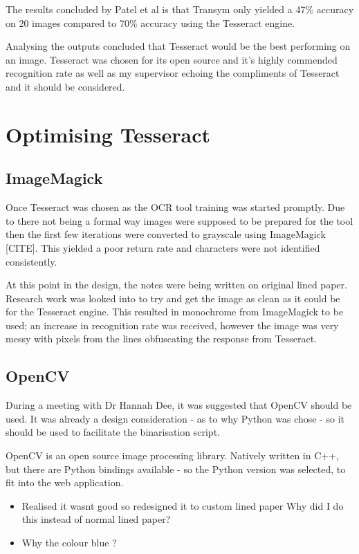 The results concluded by Patel et al is that Transym only yielded a 47\% accuracy on 20 images compared to 70\% accuracy using the Tesseract engine.

Analysing the outputs concluded that Tesseract would be the best performing on an image. Tesseract was chosen for its open source and it's highly commended recognition rate as well as my supervisor echoing the compliments of Tesseract and it should be considered.

\section{Optimising Tesseract}

\subsection{ImageMagick}
Once Tesseract was chosen as the OCR tool training was started promptly. Due to there not being a formal way images were supposed to be prepared for the tool then the first few iterations were converted to grayscale using ImageMagick [CITE]. This yielded a poor return rate and characters were not identified consistently.

At this point in the design, the notes were being written on original lined paper. Research work was looked into to try and get the image as clean as it could be for the Tesseract engine. This resulted in monochrome from ImageMagick to be used; an increase in recognition rate was received, however the image was very messy with pixels from the lines obfuscating the response from Tesseract.

\subsection{OpenCV}
During a meeting with Dr Hannah Dee, it was suggested that OpenCV should be used. It was already a design consideration - as to why Python was chose - so it should be used to facilitate the binarisation script.

OpenCV is an open source image processing library. Natively written in C++, but there are Python bindings available - so the Python version was selected, to fit into the web application.





\begin{itemize}
  \item Realised it wasnt good so redesigned it to custom lined paper Why did I do this instead of normal lined paper?
  \item Why the colour blue ?
\end{itemize}
